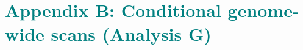 \documentclass[9pt,twocolumn,twoside]{gsajnl}
\newcommand{\GKinline}[1]{\textcolor{teal}{#1}}
\begin{document}



\section{\GKinline{Appendix B: Conditional genome-wide scans (Analysis G)}}
\end{document}
